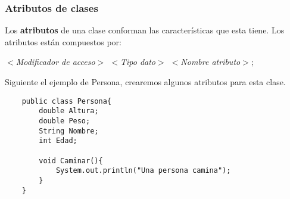 \subsubsection{Atributos de clases}
\hspace{0.55cm}Los \textbf{atributos} de una clase conforman las características que esta tiene. Los atributos están compuestos por:
\begin{center}
    \textit{$<$Modificador de acceso$>$ $<$Tipo dato$>$ $<$Nombre atributo$>;$}
\end{center}

Siguiente el ejemplo de Persona, crearemos algunos atributos para esta clase.
\begin{lstlisting}
    public class Persona{
        double Altura;
        double Peso;
        String Nombre;
        int Edad;
    
        void Caminar(){
            System.out.println("Una persona camina");
        }
    }
\end{lstlisting}

